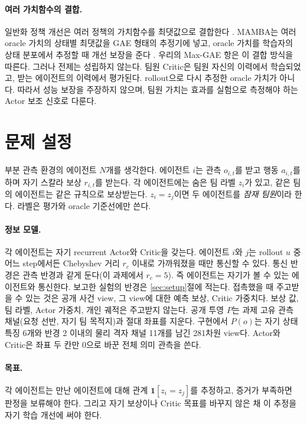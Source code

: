 \documentclass[10pt,twocolumn,letterpaper]{article}
\begin{document}
\paragraph{여러 가치함수의 결합.}
일반화 정책 개선은 여러 정책의 가치함수를 최댓값으로 결합한다 \citep{gpi}. MAMBA는 여러 oracle 가치의 상태별 최댓값을 GAE 형태의 추정기에 넣고, oracle 가치를 학습자의 상태 분포에서 추정할 때 개선 보장을 준다 \citep{mamba}. 우리의 Max-GAE 항은 이 결합 방식을 따른다. 그러나 전제는 성립하지 않는다. 팀원 Critic은 팀원 자신의 이력에서 학습되었고, 받는 에이전트의 이력에서 평가된다. rollout으로 다시 추정한 oracle 가치가 아니다. 따라서 성능 보장을 주장하지 않으며, 팀원 가치는 효과를 실험으로 측정해야 하는 Actor 보조 신호로 다룬다.

\section{문제 설정}
부분 관측 환경의 에이전트 $N$개를 생각한다. 에이전트 $i$는 관측 $o_{i,t}$를 받고 행동 $a_{i,t}$를 하며 자기 스칼라 보상 $r_{i,t}$를 받는다. 각 에이전트에는 숨은 팀 라벨 $z_i$가 있고, 같은 팀의 에이전트는 같은 규칙으로 보상받는다. $z_i=z_j$이면 두 에이전트를 \emph{잠재 팀원}이라 한다. 라벨은 평가와 oracle 기준선에만 쓴다.

\paragraph{정보 모델.}
각 에이전트는 자기 recurrent Actor와 Critic을 갖는다. 에이전트 $i$와 $j$는 rollout $u$ 중 어느 step에서든 Chebyshev 거리 $r_c$ 이내로 가까워졌을 때만 통신할 수 있다.
\DonorEquation
통신 반경은 관측 반경과 같게 둔다(이 과제에서 $r_c=5$). 즉 에이전트는 자기가 볼 수 있는 에이전트와 통신한다. 보고한 실험의 반경은 \ref{sec:setup}절에 적는다. 접촉했을 때 주고받을 수 있는 것은 공개 사건 view, 그 view에 대한 예측 보상, Critic 가중치다. 보상 값, 팀 라벨, Actor 가중치, 개인 궤적은 주고받지 않는다. 공개 투영 $P$는 과제 고유 관측 채널(요청 선반, 자기 팀 목적지)과 절대 좌표를 지운다. 구현에서 $P(o)$는 자기 상태 특징 6개와 반경 2 이내의 물리 격자 채널 11개를 남긴 281차원 view다. Actor와 Critic은 좌표 두 칸만 0으로 바꾼 전체 의미 관측을 쓴다.

\paragraph{목표.}
각 에이전트는 만난 에이전트에 대해 관계 $\mathbf 1[z_i=z_j]$를 추정하고, 증거가 부족하면 판정을 보류해야 한다. 그리고 자기 보상이나 Critic 목표를 바꾸지 않은 채 이 추정을 자기 학습 개선에 써야 한다.
\end{document}
